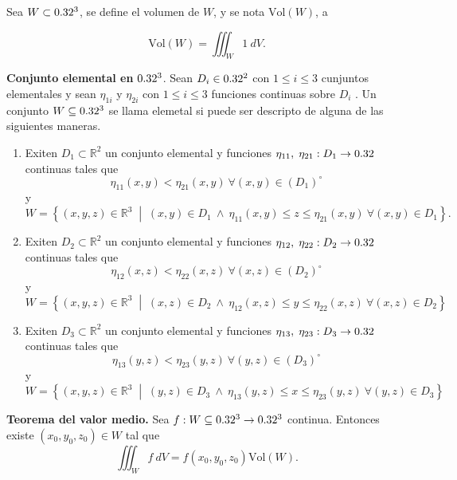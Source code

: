 \begin{definition} Sea $W\subset0.32^3$,  se define el volumen de $W$,  y se nota $\text{Vol}(W)$,  a  
    
    \[
        \text{Vol}(W)=\iiint_W 1 \:dV.
    \]
\end{definition}


\begin{definition}
    \textbf{Conjunto elemental en }$0.32^3$. Sean $D_i\in 0.32^2$ con $1 \leq i \leq 3$  cunjuntos elementales y sean $\eta_{1i}$ y $\eta_{2i}$  con $1 \leq i \leq 3$ funciones continuas sobre $D_i$ .  Un conjunto $W\subseteq0.32^3$ se llama elemetal si puede ser descripto de alguna de las siguientes maneras. 
    \begin{enumerate}
    \item Exiten $D_1 \subset  \mathbb{R}^2 $ un conjunto elemental y funciones  $\eta_{11},\; \eta_{21}: D_1\to0.32$  continuas  tales que $$\eta_{11}(x, y) <  \eta_{21}(x, y)  \: \forall (x,y) \in  (D_1)^{\circ}$$ y $$ W = \left\{ (x, y, z) \in \mathbb{R}^3 \;\middle|\;  (x,y) \in D_1 \: \land  \: \eta_{11}(x, y) \leq z \leq \eta_{21}(x, y)  \: \forall (x,y) \in D_1 \right\}.$$
	
	
	\item  Exiten $D_2 \subset  \mathbb{R}^2 $ un conjunto elemental y funciones  $\eta_{12},\; \eta_{22}: D_2\to0.32$  continuas  tales que $$\eta_{12}(x, z) <  \eta_{22}(x, z)  \: \forall (x,z) \in  (D_2)^{\circ}$$ y $$W = \left\{ (x, y, z) \in \mathbb{R}^3 \;\middle|\;  (x,z) \in D_2   \: \land  \:  \eta_{12}(x, z) \leq y \leq \eta_{22}(x, z) \: \forall (x,z) \in D_2 \right\}$$
	
	\item  Exiten $D_3 \subset  \mathbb{R}^2 $  un conjunto elemental y funciones  $\eta_{13},\; \eta_{23}: D_3\to0.32$  continuas  tales que $$\eta_{13}(y, z) <  \eta_{23}(y, z)  \: \forall (y,z) \in  (D_3)^{\circ}$$ y $$W = \left\{ (x, y, z) \in \mathbb{R}^3 \;\middle|\; (y,z) \in D_3   \: \land  \:  \eta_{13}(y, z) \leq x \leq \eta_{23}(y, z) \: \forall (y,z) \in D_3  \right\}$$
\end{enumerate}
\end{definition}


\begin{theorem} \textbf{Teorema del valor medio.}   Sea $f:W\subseteq0.32^3\to0.32^3$ continua.  Entonces existe $(x_0,y_0,z_0) \in W$ tal que 
    \[
        \iiint_W f\:dV=f(x_0,y_0,z_0)\text{Vol}(W).
    \]
\end{theorem}





